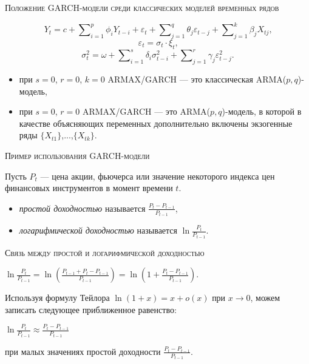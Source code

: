 
\begin{center}
\textsc{Положение GARCH-модели среди классических моделей временных рядов}
\end{center}
\[
    Y_t = c + \sum\nolimits_{i=1}^p{{\phi_i}{Y_{t-i}}} + \varepsilon_t + \sum\nolimits_{j=1}^q{{\theta_j}{\varepsilon_{t-j}}} + \sum\nolimits_{j=1}^k{{\beta_j}{X_{tj}}} \text{,}
\]
\[
    \varepsilon_t = \sigma_t\cdot\xi_t \text{,}
\]
\[
    \sigma_t^2 = \omega + \sum\nolimits_{i=1}^s{\delta_i\sigma_{t-i}^2 + \sum\nolimits_{j=1}^r{\gamma_j\varepsilon_{t-j}^2}} \text{.}
\]

\begin{itemize}
  \item при $s=0$, $r=0$, $k=0$ ARMAX/GARCH --- это классическая ARMA($p,q$)-модель,
  \item при $s=0$, $r=0$ ARMAX/GARCH --- это ARMA($p,q$)-модель, в которой в качестве объясняющих переменных дополнительно включены экзогенные ряды $\{X_{t1}\}$,...,$\{X_{tk}\}$.
\end{itemize}

\begin{center}
\textsc{Пример использования GARCH-модели}
\end{center}

Пусть ${P_t}$ --- цена акции, фьючерса или значение некоторого индекса цен финансовых инструментов в момент времени $t$.
\begin{itemize}
  \item \textit{простой доходностью} называется $\frac{P_t-P_{t-1}}{P_{t-1}}$,
  \item \textit{логарифмической доходностью} называется $\ln\frac{P_t}{P_{t-1}}$.
\end{itemize}
\textsc{Связь между простой и логарифмической доходностью}
\begin{center}
    $\ln\frac{P_t}{P_{t-1}} = \ln\left(\frac{P_{t-1} + P_t - P_{t-1}}{P_{t-1}}\right) = \ln\left(1 + \frac{P_t - P_{t-1}}{P_{t-1}}\right)$.
\end{center}
Используя формулу Тейлора $\ln(1+x) = x + o(x)$ при $x\rightarrow0$, можем записать следующее приближенное равенство:
\begin{center}
    $\ln\frac{P_t}{P_{t-1}} \approx \frac{P_t - P_{t-1}}{P_{t-1}}$
\end{center}
при малых значениях простой доходности $\frac{P_t - P_{t-1}}{P_{t-1}}$.

